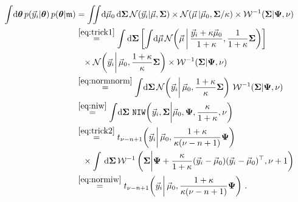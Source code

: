 \documentclass{article}
\begin{document}
\begin{align*}
    \int \! \mathrm{d} \bm{\theta} \, p(\vec{y}_i | \bm{\theta}) \, p(\bm{\theta} | \mathfrak{m})
    &= \iint \! \mathrm{d}\vec{\mu}_0 \, \mathrm{d} \bm{\Sigma} \, \mathcal{N}(\vec{y}_i | \vec{\mu}, \bm{\Sigma})
    \times \mathcal{N}(\vec{\mu} \, | \vec{\mu}_0, \bm{\Sigma} / \kappa) \times \mathcal{W}^{-1}(\bm{\Sigma} | \bm{\Psi}, \nu) \\
    &\overset{\eqref{eq:trick1}}{=} \int \mathrm{d} \bm{\Sigma} \left[ \int \! \mathrm{d} \vec{\mu} \, \mathcal{N}\! \left(\vec{\mu} \,\middle|\, \frac{\vec{y}_i + \kappa \vec{\mu}_0}{1 + \kappa}, \frac{1}{1 + \kappa} \bm{\Sigma} \right) \right] \\
    &\phantom{=} \times \mathcal{N}\! \left(\vec{y}_i \middle|\, \vec{\mu}_0, \frac{1 + \kappa}{\kappa} \bm{\Sigma} \right) \times \mathcal{W}^{-1}(\bm{\Sigma} | \bm{\Psi}, \nu) \\
    &\overset{\eqref{eq:normnorm}}{=} \int \! \mathrm{d} \bm{\Sigma} \, \mathcal{N}\! \left(\vec{y}_i \middle|\, \vec{\mu}_0, \frac{1 + \kappa}{\kappa} \bm{\Sigma} \right) \, \mathcal{W}^{-1}(\bm{\Sigma} | \bm{\Psi}, \nu) \\
    &\overset{\eqref{eq:niw}}{=} \int \! \mathrm{d} \bm{\Sigma} \, \operatorname{\texttt{NIW}} \!\left( \vec{y}_i, \bm{\Sigma} \middle| \vec{\mu}_0, \bm{\Psi}, \frac{\kappa}{1 + \kappa}, \nu \right) \\
    &\overset{\eqref{eq:trick2}}{=} t_{\nu - n + 1}\!\left(\vec{y}_i \middle| \, \vec{\mu}_0, \frac{1 + \kappa}{\kappa (\nu - n + 1)} \bm{\Psi} \right) \\
    &\phantom{=} \times \int \, \mathrm{d} \bm{\Sigma} \, \mathcal{W}^{-1} \left( \bm{\Sigma} \middle| \bm{\Psi} + \frac{\kappa}{1 + \kappa} (\vec{y}_i - \vec{\mu}_0)(\vec{y}_i - \vec{\mu}_0)^\top, \nu + 1 \right) \\
    &\overset{\eqref{eq:normiw}}{=} t_{\nu - n + 1}\!\left(\vec{y}_i \middle| \, \vec{\mu}_0, \frac{1 + \kappa}{\kappa (\nu - n + 1)} \bm{\Psi} \right) \,.
\end{align*}

\newpage
\end{document}
